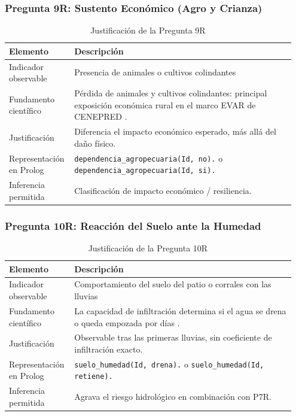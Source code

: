 \documentclass[12pt, letterpaper]{article}
\begin{document}
\subsubsection*{Pregunta 9R: Sustento Económico (Agro y Crianza)}
\begin{table}[H]
\centering
\caption{Justificación de la Pregunta 9R}
\label{tab:p9r}
\begin{tabular}{@{}p{0.2\linewidth}p{0.75\linewidth}@{}}
\toprule
\textbf{Elemento} & \textbf{Descripción} \\ \midrule
Indicador observable & Presencia de animales o cultivos colindantes \\
Fundamento científico & Pérdida de animales y cultivos colindantes: principal exposición económica rural en el marco EVAR de CENEPRED \parencite{cenepred_manual_evar}. \\
Justificación & Diferencia el impacto económico esperado, más allá del daño físico. \\
Representación en Prolog & \texttt{dependencia\_agropecuaria(Id, no).} o \texttt{dependencia\_agropecuaria(Id, si).} \\
Inferencia permitida & Clasificación de impacto económico / resiliencia. \\ \bottomrule
\end{tabular}
\end{table}

\subsubsection*{Pregunta 10R: Reacción del Suelo ante la Humedad}
\begin{table}[H]
\centering
\caption{Justificación de la Pregunta 10R}
\label{tab:p10r}
\begin{tabular}{@{}p{0.2\linewidth}p{0.75\linewidth}@{}}
\toprule
\textbf{Elemento} & \textbf{Descripción} \\ \midrule
Indicador observable & Comportamiento del suelo del patio o corrales con las lluvias \\
Fundamento científico & La capacidad de infiltración determina si el agua se drena o queda empozada por días \parencite{cenepred_jornada}. \\
Justificación & Observable tras las primeras lluvias, sin coeficiente de infiltración exacto. \\
Representación en Prolog & \texttt{suelo\_humedad(Id, drena).} o \texttt{suelo\_humedad(Id, retiene).} \\
Inferencia permitida & Agrava el riesgo hidrológico en combinación con P7R. \\ \bottomrule
\end{tabular}
\end{table}
\end{document}
